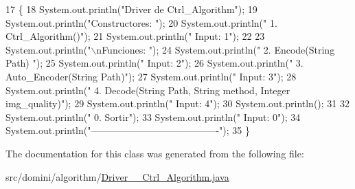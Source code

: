 \begin{DoxyCode}
17                                      \{
18         System.out.println(\textcolor{stringliteral}{"Driver de Ctrl\_Algorithm"});
19         System.out.println(\textcolor{stringliteral}{"Constructores: "});
20         System.out.println(\textcolor{stringliteral}{"     1. Ctrl\_Algorithm()"});
21         System.out.println(\textcolor{stringliteral}{"     Input: 1"});
22 
23         System.out.println(\textcolor{stringliteral}{"\(\backslash\)nFunciones: "});
24         System.out.println(\textcolor{stringliteral}{"     2. Encode(String Path) "});
25         System.out.println(\textcolor{stringliteral}{"     Input: 2"});
26         System.out.println(\textcolor{stringliteral}{"     3. Auto\_Encoder(String Path)"});
27         System.out.println(\textcolor{stringliteral}{"     Input: 3"});
28         System.out.println(\textcolor{stringliteral}{"     4. Decode(String Path, String method, Integer img\_quality)"});
29         System.out.println(\textcolor{stringliteral}{"     Input: 4"});
30         System.out.println();
31 
32         System.out.println(\textcolor{stringliteral}{"     0. Sortir"});
33         System.out.println(\textcolor{stringliteral}{"     Input: 0"});
34         System.out.println(\textcolor{stringliteral}{"----------------------------------------"});
35     \}
\end{DoxyCode}


The documentation for this class was generated from the following file\+:\begin{DoxyCompactItemize}
\item 
src/domini/algorithm/\hyperlink{Driver____Ctrl__Algorithm_8java}{Driver\+\_\+\+\_\+\+Ctrl\+\_\+\+Algorithm.\+java}\end{DoxyCompactItemize}
